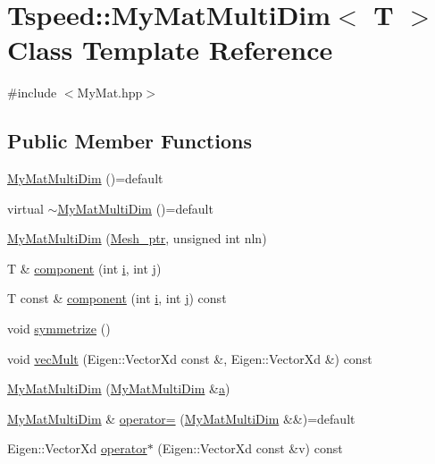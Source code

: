 \hypertarget{classTspeed_1_1MyMatMultiDim}{\section{Tspeed\-:\-:My\-Mat\-Multi\-Dim$<$ T $>$ Class Template Reference}
\label{classTspeed_1_1MyMatMultiDim}
}


{\ttfamily \#include $<$My\-Mat.\-hpp$>$}

\subsection*{Public Member Functions}
\begin{DoxyCompactItemize}
\item 
\hyperlink{classTspeed_1_1MyMatMultiDim_a1d08f2d14a8074dbfc0fb0ccf85c5bd3}{My\-Mat\-Multi\-Dim} ()=default
\item 
virtual \hyperlink{classTspeed_1_1MyMatMultiDim_a1186b247ce40afb915e3fac80f99deb3}{$\sim$\-My\-Mat\-Multi\-Dim} ()=default
\item 
\hyperlink{classTspeed_1_1MyMatMultiDim_aae1c5f412040fbc3f344f612b4609f95}{My\-Mat\-Multi\-Dim} (\hyperlink{namespaceTspeed_a7367a01365c4cc2c1a09305b3effc4e8}{Mesh\-\_\-ptr}, unsigned int nln)
\item 
T \& \hyperlink{classTspeed_1_1MyMatMultiDim_a03782558106363767dd160f5170e6a66}{component} (int \hyperlink{vtk__vector__out_8m_a6f6ccfcf58b31cb6412107d9d5281426}{i}, int \hyperlink{vtk__mesh__out_8m_af1af736f0a1475ea44566768103395cb}{j})
\item 
T const \& \hyperlink{classTspeed_1_1MyMatMultiDim_a4d217bb29f278fb65a8f02df72bf7142}{component} (int \hyperlink{vtk__vector__out_8m_a6f6ccfcf58b31cb6412107d9d5281426}{i}, int \hyperlink{vtk__mesh__out_8m_af1af736f0a1475ea44566768103395cb}{j}) const 
\item 
void \hyperlink{classTspeed_1_1MyMatMultiDim_a9e0b39723d52237575763129f4056349}{symmetrize} ()
\item 
void \hyperlink{classTspeed_1_1MyMatMultiDim_aac722312a8618d4c00033c9f6a86f7f7}{vec\-Mult} (Eigen\-::\-Vector\-Xd const \&, Eigen\-::\-Vector\-Xd \&) const 
\item 
\hyperlink{classTspeed_1_1MyMatMultiDim_a34932323d5f4aff040b1e85f5a89d341}{My\-Mat\-Multi\-Dim} (\hyperlink{classTspeed_1_1MyMatMultiDim}{My\-Mat\-Multi\-Dim} \&\hyperlink{load__and__plot__lamb_8m_aa875ab3a8009406dcace7fa71a0f490d}{a})
\item 
\hyperlink{classTspeed_1_1MyMatMultiDim}{My\-Mat\-Multi\-Dim} \& \hyperlink{classTspeed_1_1MyMatMultiDim_aadd37f5678750bbda4b536ecc5a00851}{operator=} (\hyperlink{classTspeed_1_1MyMatMultiDim}{My\-Mat\-Multi\-Dim} \&\&)=default
\item 
Eigen\-::\-Vector\-Xd \hyperlink{classTspeed_1_1MyMatMultiDim_acc8cd12d144a32a4be0c2dcb015156df}{operator$\ast$} (Eigen\-::\-Vector\-Xd const \&v) const 
\end{DoxyCompactItemize}
